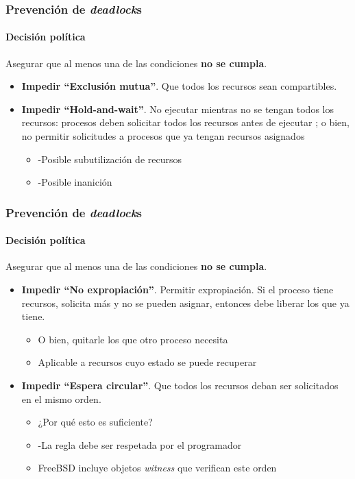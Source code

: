 \documentclass[letter]{beamer}
\begin{document}
\begin{frame}
  \frametitle{Prevención de {\em deadlock}s}
  \framesubtitle{Decisión política}

  Asegurar que al menos una de las condiciones {\bf no se cumpla}.
  

  \begin{itemize}
    \item {\bf Impedir ``Exclusión mutua''}. Que todos los recursos sean compartibles.
    \item {\bf Impedir ``Hold-and-wait''}. No ejecutar mientras no se tengan todos los recursos:
          procesos deben solicitar todos los recursos antes de ejecutar ; o bien,
          no permitir solicitudes a procesos que ya tengan recursos asignados
          \begin{itemize}
            \item -Posible subutilización de recursos
            \item -Posible inanición
          \end{itemize}
  \end{itemize}
\end{frame}


\begin{frame}
  \frametitle{Prevención de {\em deadlock}s}
  \framesubtitle{Decisión política}

  Asegurar que al menos una de las condiciones {\bf no se cumpla}.
  

  \begin{itemize}
    \item {\bf Impedir ``No expropiación''}. Permitir expropiación.
          Si el proceso tiene recursos, solicita más y no se pueden asignar, entonces
          debe liberar los que ya tiene.
            \begin{itemize}
              \item O bien, quitarle los que otro proceso necesita
              \item Aplicable a recursos cuyo estado se puede recuperar
            \end{itemize}

    \item {\bf Impedir ``Espera circular''}. Que todos los recursos deban ser solicitados en el mismo orden.
          \begin{itemize}
            \item ¿Por qué esto es suficiente?
            \item -La regla debe ser respetada por el programador
            \item FreeBSD incluye objetos {\em witness} que verifican este orden
          \end{itemize}
  \end{itemize}
\end{frame}
\end{document}
